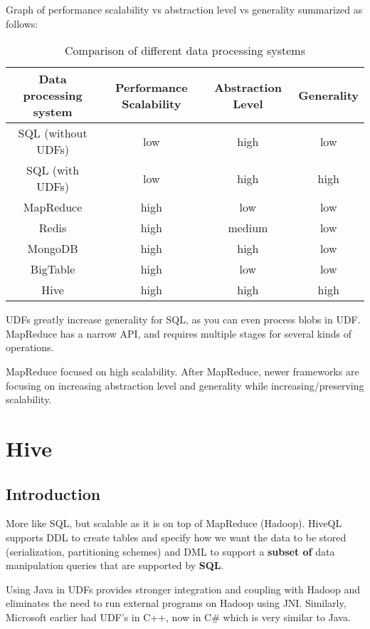 \documentclass[twoside]{article}
\begin{document}
Graph of performance scalability vs abstraction level vs generality summarized as follows:
\begin{table}[H]
    \centering
    \begin{tabular}{c|c|c|c}
        Data processing system & Performance Scalability & Abstraction Level & Generality \\ \hline
        SQL (without UDFs) & low & high & low \\
        SQL (with UDFs) & low & high & high \\
        MapReduce & high & low & low \\
        Redis & high & medium & low \\
        MongoDB & high & high & low \\
        BigTable & high & low & low \\
        Hive & high & high & high
    \end{tabular}
    \caption{Comparison of different data processing systems}
    \label{tab:my_label}
\end{table}

UDFs greatly increase generality for SQL, as you can even process blobs in UDF. MapReduce has a narrow API, and requires multiple stages for several kinds of operations.

MapReduce focused on high scalability. After MapReduce, newer frameworks are focusing on increasing abstraction level and generality while increasing/preserving scalability.

\clearpage

\section{Hive}

\subsection{Introduction}
More like SQL, but scalable as it is on top of MapReduce (Hadoop). HiveQL supports DDL to create tables and specify how we want the data to be stored (serialization, partitioning schemes) and DML to support a \textbf{subset of} data manipulation queries that are supported by \textbf{SQL}.

Using Java in UDFs provides stronger integration and coupling with Hadoop and eliminates the need to run external programs on Hadoop using JNI. Similarly, Microsoft earlier had UDF's in C++, now in C\# which is very similar to Java.
\end{document}
